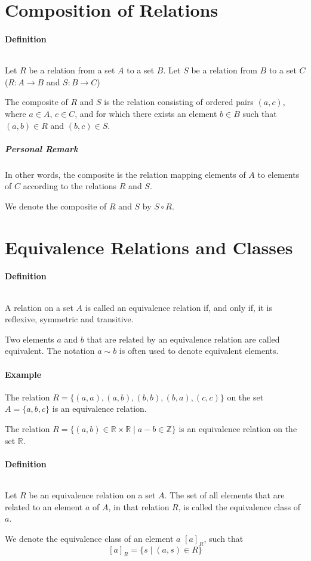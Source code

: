 \documentclass[10pt,a4paper]{book}
\newcommand{\R}{\mathbb{R}}
\begin{document}
\section{Composition of Relations}
\paragraph*{Definition}
$\ $\par
Let $R$ be a relation from a set $A$ to a set $B$. Let $S$ be a relation from $B$ to a set $C$ ($R : A \to B$ and $S : B \to C$)\par
The composite of $R$ and $S$ is the relation consisting of ordered pairs $(a,c)$, where $a \in A$, $c \in C$, and for which there exists an element $b \in B$ such that $(a,b) \in R$ and $(b,c) \in S$.
\subparagraph*{Personal Remark}
In other words, the composite is the relation mapping elements of $A$ to elements of $C$ according to the relations $R$ and $S$.\par
$\ $\\
We denote the composite of $R$ and $S$ by $S \circ R$.

\section{Equivalence Relations and Classes}
\paragraph*{Definition}
$\ $\par
A relation on a set $A$ is called an equivalence relation if, and only if, it is reflexive, symmetric and transitive.\par
Two elements $a$ and $b$ that are related by an equivalence relation are called equivalent. The notation $a \sim b$ is often used to denote equivalent elements.
\paragraph*{Example}
The relation $R = \{(a,a),(a,b),(b,b),(b,a),(c,c)\}$ on the set $A = \{a,b,c\}$ is an equivalence relation.\par
The relation $R = \{(a,b) \in \R \times \R \mid a - b \in \mathbb{Z}\}$ is an equivalence relation on the set $\mathbb{R}$.
\paragraph*{Definition}
$\ $\par
Let $R$ be an equivalence relation on a set $A$. The set of all elements that are related to an element $a$ of $A$, in that relation $R$, is called the equivalence class of $a$.\par
We denote the equivalence class of an element $a$  $[a]_R$, such that \[[a]_R = \{s \mid (a,s) \in R\}\]
\end{document}
